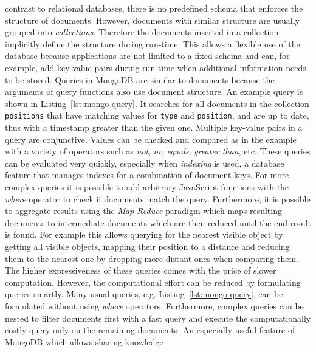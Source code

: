 \documentclass[a4paper,11pt]{article}
\newcommand{\reflst}[1]{Listing~\ref{#1}}
\begin{document}
contrast to relational databases, there is no predefined schema that
enforces the structure of documents. However, documents with similar
structure are usually grouped into \emph{collections}. Therefore the
documents inserted in a collection implicitly define the structure
during run-time. This allows a flexible use of the database because
applications are not limited to a fixed schema and can, for example,
add key-value pairs during run-time when additional information needs
to be stored.
Queries in MongoDB are similar to documents because the arguments of
query functions also use document structure. An example query is
shown in \reflst{lst:mongo-query}. It searches for all documents in
the collection \texttt{positions}
that have matching  values for \texttt{type} and \texttt{position}, and
are up to date, thus with a timestamp greater than the given
one. Multiple key-value pairs in a query are conjunctive.
Values can be checked and compared as in the example
with a variety of operators such as \textit{not}, \textit{or},
\textit{equals}, \textit{greater than}, etc. These
queries can be evaluated very quickly, especially when \emph{indexing}
is used, a database feature that manages indexes for a combination of
document keys. For more complex queries it is
possible to add arbitrary JavaScript functions with the \textit{where}
operator to check if documents match the query. Furthermore, it is
possible to aggregate results using the \emph{Map-Reduce} paradigm
which maps resulting documents to intermediate documents which are
then reduced until the end-result is found. For example this allows
querying for the nearest visible object by getting all visible
objects, mapping their position to a distance and reducing them to the
nearest one by dropping more distant ones when comparing them.  The
higher expressiveness of these queries comes with the price of slower
computation. However, the computational effort can be reduced by
formulating queries smartly. Many usual queries,
e.g. \reflst{lst:mongo-query}, can be formulated without using
\textit{where} operators. Furthermore, complex queries can be nested
to filter documents first with a fast query and execute the
computationally costly query only on the remaining documents.
%
An especially useful feature of MongoDB which allows sharing knowledge
\end{document}
